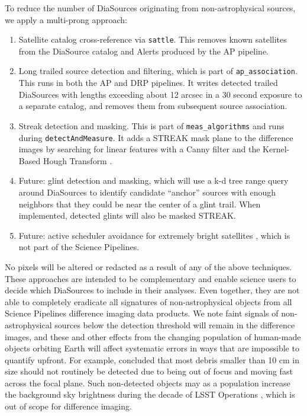 To reduce the number of DiaSources originating from non-astrophysical sources, we apply a multi-prong approach:

\begin{enumerate}
\item Satellite catalog cross-reference via \texttt{sattle}.
This removes known satellites from the DiaSource catalog and Alerts produced by the AP pipeline.

\item Long trailed source detection and filtering, which is part of \texttt{ap\_association}.
This runs in both the AP and DRP pipelines. It writes detected trailed DiaSources with lengths exceeding about 12 arcsec in a 30 second exposure to a separate catalog, and removes them from subsequent source association.

\item Streak detection and masking.
This is part of \texttt{meas\_algorithms} and runs during \texttt{detectAndMeasure}.
It adds a STREAK mask plane to the difference images by searching for linear features with a Canny filter and the Kernel-Based Hough Transform \citep{2008PatRe..41..299F}.

\item Future: glint detection and masking, which will use a k-d tree range query around DiaSources to identify candidate ``anchor'' sources with enough neighbors that they could be near the center of a glint trail.
When implemented, detected glints will also be masked STREAK.

\item Future: active scheduler avoidance for extremely bright satellites \citep{2022ApJ...941L..15H}, which is not part of the Science Pipelines.
\end{enumerate}

No pixels will be altered or redacted as a result of any of the above techniques.
These approaches are intended to be complementary and enable science users to decide which DiaSources to include in their analyses.
Even together, they are not able to completely eradicate all signatures of non-astrophysical objects from all Science Pipelines difference imaging data products.
We note faint signals of non-astrophysical sources below the detection threshold will remain in the difference images, and these and other effects from the changing population of human-made objects orbiting Earth will affect systematic errors in ways that are impossible to quantify upfront.
For example, \citet{2024ApJ...966L..38T} concluded that most debris smaller than 10 cm in size should not routinely be detected due to being out of focus and moving fast across the focal plane.
Such non-detected objects may as a population increase the background sky brightness during the decade of LSST Operations \citep{2021MNRAS.504L..40K,2023NatAs...7..252B}, which is out of scope for difference imaging.
